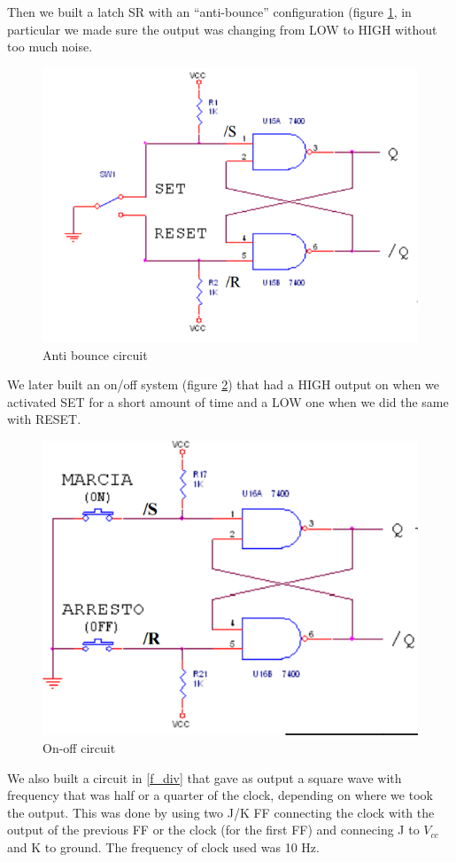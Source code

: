 Then we  built a latch SR with an ``anti-bounce'' configuration (figure \ref{bounce}, in particular we made sure the output was changing from LOW to HIGH without too much noise.
\begin{figure}[H]
\centering
\includegraphics[width=.7\textwidth]{11/bounce.png}
\caption{Anti bounce circuit}\label{bounce}

\end{figure}
We later built an on/off system (figure \ref{ON_OFF}) that had a HIGH output on when we activated SET for a short amount of time and a LOW one when we did the same with RESET.
\begin{figure}[H]
\centering
\includegraphics[width=.7\textwidth]{11/ON_OFF.png}
\caption{On-off circuit}\label{ON_OFF}

\end{figure}
We also built a circuit in \ref{f_div} that gave as output a square wave with frequency that was half or a quarter of the clock, depending on where we took the output. This was done by using two J/K FF connecting the clock with the output of the previous  FF or the clock (for the first FF) and connecing J to $V_{cc}$ and K to ground. The frequency of clock used was 10 Hz.

